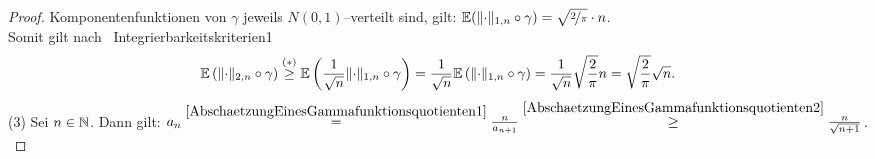 \begin{proof}
Komponentenfunktionen von $\gamma$ jeweils
$N(0,1)$--verteilt sind, gilt: $\mathbb{E}(\lVert\cdot\rVert_{1,n} \circ \gamma) 
= \sqrt{\nicefrac 2 \pi}\cdot n$.\\
Somit gilt nach~
{Integrierbarkeitskriterien1}
\begin{align*}\mathbb{E}\left(\lVert\cdot\rVert_{2,n} \circ \gamma \right)
 \overset{(\ast)}\ge \mathbb{E} \left(\frac 1 {\sqrt n} \lVert\cdot\rVert_{1,n}
\circ \gamma \right) = \frac 1 {\sqrt n} \mathbb{E} \left(\lVert\cdot\rVert_{1,n}\circ \gamma
\right)
= \frac 1 {\sqrt n} \sqrt{\frac 2 \pi} n = \sqrt{\frac 2 \pi} \sqrt n\text.
\end{align*}
(3) Sei $n \in \mathbb{N}$. 
Dann gilt: 
$a_n \overset{\eqref{AbschaetzungEinesGammafunktionsquotienten1}}= 
\frac n {a_{n+1}}
\overset{\eqref{AbschaetzungEinesGammafunktionsquotienten2}}\ge 
\frac n {\sqrt{n+1}}$.\\
\end{proof}